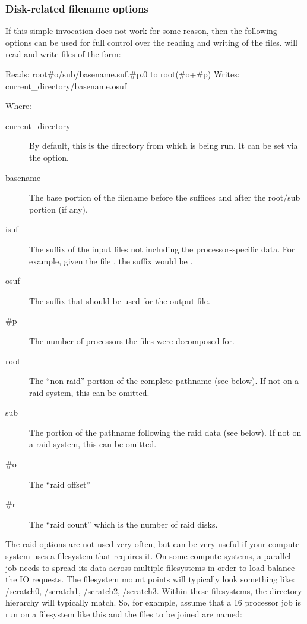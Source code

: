 \subsubsection{Disk-related filename options}
If this simple invocation does not work for some reason, then the
following options can be used for full control over the reading and writing of the
files. \epu{} will read and write files of the form:
\begin{syntax}
        Reads:  root\#o/sub/basename.suf.\#p.0 to
                root(\#o+\#p)%
        Writes: current\_directory/basename.osuf
\end{syntax}
Where:
\begin{description}
\item[current\_directory] By default, this is the directory from which
\epu{} is being run.  It can be set via the  option.

\item[basename] The base portion of the filename before the suffices
and after the root/sub portion (if any).
\item[isuf] The suffix of the input files not including the
processor-specific data. For example, given the file
, the suffix would be .
\item[osuf] The suffix that should be used for the output file.
\item[\#p] The number of processors the files were decomposed for.
\item[root] The ``non-raid'' portion of the complete pathname (see
below).  If not on a raid system, this can be omitted.
\item[sub]  The portion of the pathname following the raid data (see
below). If not on a raid system, this can be omitted.
\item[\#o] The ``raid offset'' 
\item[\#r] The ``raid count'' which is the number of raid disks. 
\end{description}

The raid options are not used very often, but can be very useful if
your compute system uses a filesystem that requires it.  On some
compute systems, a parallel job needs to spread its data across
multiple filesystems in order to load balance the IO requests.  The
filesystem mount points will typically look something like:
/scratch0, /scratch1, /scratch2, /scratch3.  Within these filesystems,
the directory hierarchy will typically match.  So, for example, assume
that a 16 processor job is run on a filesystem like this and the
files to be joined are named:

